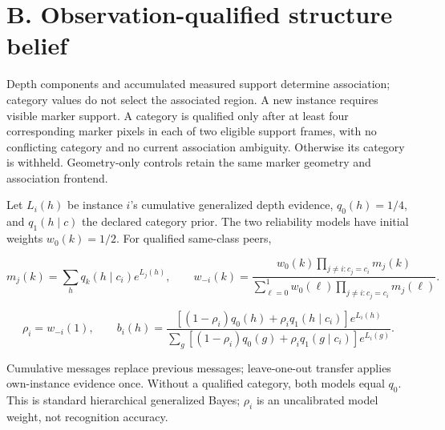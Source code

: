 \documentclass[11pt,a4paper]{article}
\begin{document}
\hypertarget{b.-observation-qualified-structure-belief}{%
\section*{B. Observation-qualified structure belief}\label{b.-observation-qualified-structure-belief}}

Depth components and accumulated measured support determine association; category values do not select the associated region. A new instance requires visible marker support. A category is qualified only after at least four corresponding marker pixels in each of two eligible support frames, with no conflicting category and no current association ambiguity. Otherwise its category is withheld. Geometry-only controls retain the same marker geometry and association frontend.

Let \(L_i(h)\) be instance \(i\)'s cumulative generalized depth evidence, \(q_0(h)=1/4\), and \(q_1(h\mid c)\) the declared category prior. The two reliability models have initial weights \(w_0(k)=1/2\). For qualified same-class peers,

\[
m_j(k)=\sum_h q_k(h\mid c_i)e^{L_j(h)},\qquad
w_{-i}(k)=\frac{w_0(k)\prod_{j\ne i:c_j=c_i}m_j(k)}
{\sum_{\ell=0}^{1}w_0(\ell)\prod_{j\ne i:c_j=c_i}m_j(\ell)}.
\tag{A1}
\]

\[
\rho_i=w_{-i}(1),\qquad
b_i(h)=\frac{[(1-\rho_i)q_0(h)+\rho_iq_1(h\mid c_i)]e^{L_i(h)}}
{\sum_g[(1-\rho_i)q_0(g)+\rho_iq_1(g\mid c_i)]e^{L_i(g)}}.
\tag{A2}
\]

Cumulative messages replace previous messages; leave-one-out transfer applies own-instance evidence once. Without a qualified category, both models equal \(q_0\). This is standard hierarchical generalized Bayes; \(\rho_i\) is an uncalibrated model weight, not recognition accuracy.
\end{document}
